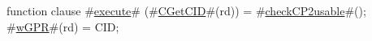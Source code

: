 function clause #\hyperref[zexecute]{execute}# (#\hyperref[zCGetCID]{CGetCID}#(rd)) = 
{
  #\hyperref[zcheckCP2usable]{checkCP2usable}#();
  #\hyperref[zwGPR]{wGPR}#(rd) = CID;
}
